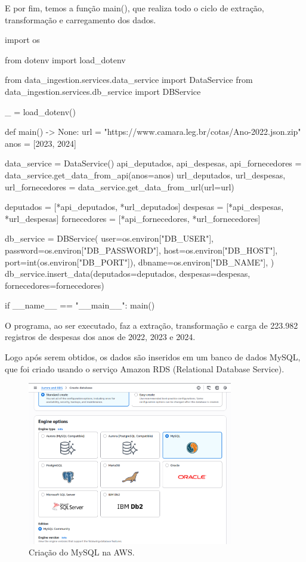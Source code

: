 \documentclass[12pt, a4paper]{article}
\begin{document}
E por fim, temos a função main(), que realiza todo o ciclo de extração, transformação e carregamento dos dados.

\begin{python}
import os

from dotenv import load_dotenv

from data_ingestion.services.data_service import DataService
from data_ingestion.services.db_service import DBService

_ = load_dotenv()


def main() -> None:
	url = "https://www.camara.leg.br/cotas/Ano-2022.json.zip"
	anos = [2023, 2024]
	
	data_service = DataService()
	api_deputados, api_despesas, api_fornecedores = data_service.get_data_from_api(anos=anos)
	url_deputados, url_despesas, url_fornecedores = data_service.get_data_from_url(url=url)
	
	deputados = [*api_deputados, *url_deputados]
	despesas = [*api_despesas, *url_despesas]
	fornecedores = [*api_fornecedores, *url_fornecedores]
	
	db_service = DBService(
		user=os.environ["DB_USER"],
		password=os.environ["DB_PASSWORD"],
		host=os.environ["DB_HOST"],
		port=int(os.environ["DB_PORT"]),
		dbname=os.environ["DB_NAME"],
	)
	db_service.insert_data(deputados=deputados, despesas=despesas, fornecedores=fornecedores)


if __name__ == "__main__":
	main()
\end{python}

O programa, ao ser executado, faz a extração, transformação e carga de 223.982 registros de despesas dos anos de 2022, 2023 e 2024.

Logo após serem obtidos, os dados são inseridos em um banco de dados MySQL, que foi criado usando o serviço Amazon RDS (Relational Database Service).

\begin{figure}[!htbp]
    \centering
    \includegraphics[width=0.8\textwidth]{assets/1_criacao.png}
    \caption{Criação do MySQL na AWS.}
    \label{fig:criacao_mysql}
\end{figure}
\newpage
\end{document}
